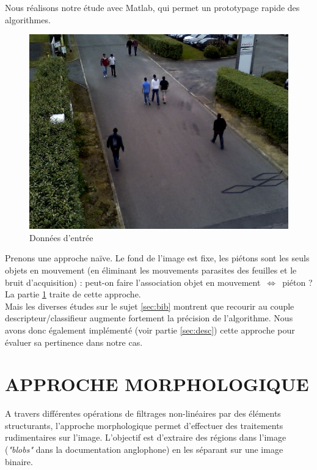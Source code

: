 \documentclass{article}
\begin{document}
	Nous réalisons notre étude avec Matlab, qui permet un prototypage rapide des algorithmes.\\
	
	\begin{figure}
		\begin{center}			
			\includegraphics[scale=0.3]{Img/detection_0156}
		\end{center}
		\caption{Données d'entrée}
	\end{figure}
	
	Prenons une approche naïve. Le fond de l'image est fixe, les piétons sont les seuls objets en mouvement (en éliminant les mouvements parasites des feuilles et le bruit d'acquisition) : peut-on faire l'association objet en mouvement~$\Leftrightarrow $~piéton ? La partie \ref{sec:morpho} traite de cette approche.
	\\
	
	Mais les diverses études sur le sujet \ref{sec:bib} montrent que recourir au couple descripteur/classifieur augmente fortement la précision de l'algorithme. Nous avons donc également implémenté (voir partie \ref{sec:desc}) cette approche pour évaluer sa pertinence dans notre cas.

\section{APPROCHE MORPHOLOGIQUE}
\label{sec:morpho}

	A travers différentes opérations de filtrages non-linéaires par des éléments structurants, l'approche morphologique permet d'effectuer des traitements rudimentaires sur l'image. L'objectif est d'extraire des régions dans l'image (\emph{"blobs"} dans la documentation anglophone) en les séparant sur une image binaire.
	
\end{document}
